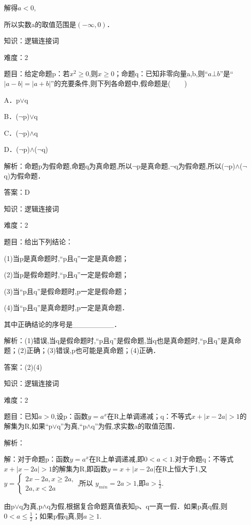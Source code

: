 \documentclass{article} %
\begin{document}
解得$a<0$,

所以实数a的取值范围是$(-\infty,0)$．



知识：逻辑连接词

难度：2

题目：给定命题p：若$x^{2}\ge0$,则$x\ge0$；命题q：已知非零向量a,b,则``$a\bot b$''是``$|a-b|=|a+b|$''的充要条件,则下列各命题中,假命题是(　　)

A．p${\vee}$q   

B．($\neg$p)${\vee}$q

C．($\neg$p)${\wedge}$q   

D．($\neg$p)${\wedge}$($\neg$q)

解析：命题p为假命题,命题q为真命题,所以$\neg$p是真命题,$\neg$q为假命题,所以($\neg$p)${\wedge}$($\neg$q)为假命题．

答案：D



知识：逻辑连接词

难度：2

题目：给出下列结论：

(1)当p是真命题时,``p且q''一定是真命题；

(2)当p是假命题时,``p且q''一定是假命题；

(3)当``p且q''是假命题时,p一定是假命题；

(4)当``p且q''是真命题时,p一定是真命题．

其中正确结论的序号是\_\_\_\_\_\_\_\_．

解析：(1)错误,当q是假命题时,``p且q''是假命题,当q也是真命题时,``p且q''是真命题；(2)正确；(3)错误,p也可能是真命题；(4)正确．

答案：(2)(4)



知识：逻辑连接词

难度：2

题目：已知$a>0$,设p：函数$y=a^{x}$在R上单调递减；q：不等式$x+|x-2a|>1$的解集为R,如果``p${\vee}$q''为真,``p${\wedge}$q''为假,求实数a的取值范围．

解析：

解：对于命题p：函数$y=a^{x}$在R上单调递减,即$0<a<1$.对于命题q：不等式$x+|x-2a|>1$的解集为R,即函数$y=x+|x-2a|$在R上恒大于1,又$y=\left\{
\begin{array}{l}
2x-2a, x\ge 2a, \\
2a, x<2a
\end{array}
\right.$,所以 $y_{min}=2a>1$,即$a>\frac{1}{2}$.

由p${\vee}$q为真,p${\wedge}$q为假,根据复合命题真值表知p、q一真一假．如果p真q假,则$0<a{\le}\frac{1}{2}$；如果p假q真,则$a{\ge}1$.
\end{document}
